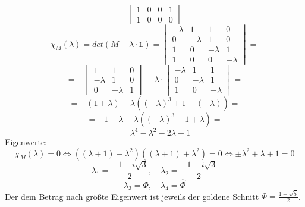\begin{enumerate}
\[\begin{bmatrix}
                         1 & 0 & 0 & 1 \\ 1 & 0 & 0 & 0 \end{bmatrix} \]
  \[ \chi_M(\lambda) = det(M - \lambda \cdot \mathds{1})
     = \begin{vmatrix} -\lambda & 1 & 1 & 0 \\
                       0 & -\lambda & 1 & 0 \\
                       1 & 0 & -\lambda & 1 \\
                       1 & 0 & 0 & -\lambda \end{vmatrix} = \]
  \[ = -\begin{vmatrix} 1 & 1 & 0 \\ 
                        -\lambda & 1 & 0 \\
                        0 & -\lambda & 1 \end{vmatrix} - \lambda \cdot
        \begin{vmatrix} -\lambda & 1 & 1 \\
                        0 & -\lambda & 1 \\
                        1 & 0 & -\lambda \end{vmatrix} = \]
  \[ = -(1 + \lambda) - \lambda ((-\lambda)^3 + 1 - (-\lambda)) = \]
  \[ = - 1 - \lambda - \lambda ((-\lambda)^3 + 1 + \lambda) = \]
  \[ = \lambda^4 - \lambda^2 - 2\lambda - 1 \]
  Eigenwerte:
  \[ \chi_M(\lambda) = 0 \Leftrightarrow 
     ((\lambda + 1) - \lambda^2)((\lambda + 1) + \lambda^2) = 0
     \Leftrightarrow \pm \lambda^2 + \lambda + 1 = 0 \]
  \[ \lambda_1 = \frac{-1 + i\sqrt{3}}{2}, \quad
     \lambda_2 = \frac{-1 - i\sqrt{3}}{2} \]
  \[ \lambda_3 = \Phi, \quad \lambda_4 = \hat \Phi \]
  Der dem Betrag nach größte Eigenwert ist jeweils der goldene Schnitt $\Phi =
  \frac{1 + \sqrt{5}}{2}$.
\end{enumerate}
